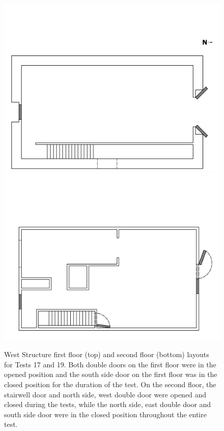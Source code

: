 \documentclass[12pt,oneside]{book}
\begin{document}
\begin{figure}[!ht]
\includegraphics[trim=0cm 0cm 0.75cm 4.5cm, clip=true, width=6in]{../Drawings/Specific_Tests/West_Structure_Hose_Test_19_1st_Floor}
\\
\includegraphics[trim=0cm 0cm 0.75cm 5cm, clip=true, width=6in]{../Drawings/Specific_Tests/West_Structure_Hose_Test_19_2nd_Floor}
\caption[West Structure first and second floor layouts for Tests 17 and 19]{West Structure first floor (top) and second floor (bottom) layouts for Tests 17 and 19. Both double doors on the first floor were in the opened position and the south side door on the first floor was in the closed position for the duration of the test. On the second floor, the stairwell door and north side, west double door were opened and closed during the tests, while the north side, east double door and south side door were in the closed position throughout the entire test.}
\label{fig:flow_path_2}
\end{figure}
\FloatBarrier
\end{document}
